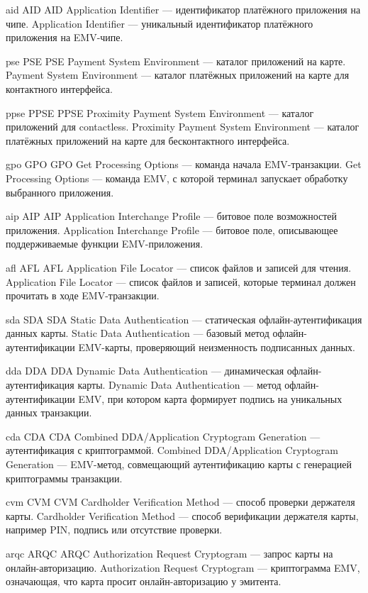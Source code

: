 \DeclareTerm
{aid}
{AID}
{AID}
{Application Identifier — идентификатор платёжного приложения на чипе.}
{Application Identifier — уникальный идентификатор платёжного приложения на EMV-чипе.}

\DeclareTerm
{pse}
{PSE}
{PSE}
{Payment System Environment — каталог приложений на карте.}
{Payment System Environment — каталог платёжных приложений на карте для контактного интерфейса.}

\DeclareTerm
{ppse}
{PPSE}
{PPSE}
{Proximity Payment System Environment — каталог приложений для contactless.}
{Proximity Payment System Environment — каталог платёжных приложений на карте для бесконтактного интерфейса.}

\DeclareTerm
{gpo}
{GPO}
{GPO}
{Get Processing Options — команда начала EMV-транзакции.}
{Get Processing Options — команда EMV, с которой терминал запускает обработку выбранного приложения.}

\DeclareTerm
{aip}
{AIP}
{AIP}
{Application Interchange Profile — битовое поле возможностей приложения.}
{Application Interchange Profile — битовое поле, описывающее поддерживаемые функции EMV-приложения.}

\DeclareTerm
{afl}
{AFL}
{AFL}
{Application File Locator — список файлов и записей для чтения.}
{Application File Locator — список файлов и записей, которые терминал должен прочитать в ходе EMV-транзакции.}

\DeclareTerm
{sda}
{SDA}
{SDA}
{Static Data Authentication — статическая офлайн-аутентификация данных карты.}
{Static Data Authentication — базовый метод офлайн-аутентификации EMV-карты, проверяющий неизменность подписанных данных.}

\DeclareTerm
{dda}
{DDA}
{DDA}
{Dynamic Data Authentication — динамическая офлайн-аутентификация карты.}
{Dynamic Data Authentication — метод офлайн-аутентификации EMV, при котором карта формирует подпись на уникальных данных транзакции.}

\DeclareTerm
{cda}
{CDA}
{CDA}
{Combined DDA/Application Cryptogram Generation — аутентификация с криптограммой.}
{Combined DDA/Application Cryptogram Generation — EMV-метод, совмещающий аутентификацию карты с генерацией криптограммы транзакции.}

\DeclareTerm
{cvm}
{CVM}
{CVM}
{Cardholder Verification Method — способ проверки держателя карты.}
{Cardholder Verification Method — способ верификации держателя карты, например PIN, подпись или отсутствие проверки.}

\DeclareTerm
{arqc}
{ARQC}
{ARQC}
{Authorization Request Cryptogram — запрос карты на онлайн-авторизацию.}
{Authorization Request Cryptogram — криптограмма EMV, означающая, что карта просит онлайн-авторизацию у эмитента.}

